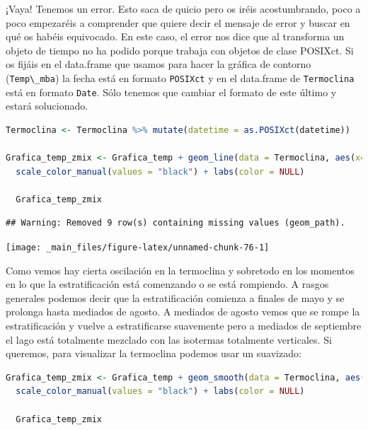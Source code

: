\documentclass[
]{book}
\newcommand{\passthrough}[1]{#1}
\begin{document}
¡Vaya! Tenemos un error. Esto saca de quicio pero os iréis acostumbrando, poco a poco empezaréis a comprender que quiere decir el mensaje de error y buscar en qué os habéis equivocado. En este caso, el error nos dice que al transforma un objeto de tiempo no ha podido porque trabaja con objetos de clase POSIXct. Si os fijáis en el data.frame que usamos para hacer la gráfica de contorno (\passthrough{\lstinline!Temp\_mba!}) la fecha está en formato \passthrough{\lstinline!POSIXct!} y en el data.frame de \passthrough{\lstinline!Termoclina!} está en formato \passthrough{\lstinline!Date!}. Sólo tenemos que cambiar el formato de este último y estará solucionado.

\begin{lstlisting}[language=R]
Termoclina <- Termoclina %>% mutate(datetime = as.POSIXct(datetime))

Grafica_temp_zmix <- Grafica_temp + geom_line(data = Termoclina, aes(x=datetime, y = thermo.depth, color = "Termoclina"), size = 0.2)+
  scale_color_manual(values = "black") + labs(color = NULL)
  
  Grafica_temp_zmix
\end{lstlisting}

\begin{lstlisting}
## Warning: Removed 9 row(s) containing missing values (geom_path).
\end{lstlisting}

\texttt{[image: \_main\_files/figure-latex/unnamed-chunk-76-1]}

Como vemos hay cierta oscilación en la termoclina y sobretodo en los momentos en lo que la estratificación está comenzando o se está rompiendo. A rasgos generales podemos decir que la estratificación comienza a finales de mayo y se prolonga hasta mediados de agosto. A mediados de agosto vemos que se rompe la estratificación y vuelve a estratificarse suavemente pero a mediados de septiembre el lago está totalmente mezclado con las isotermas totalmente verticales. Si queremos, para visualizar la termoclina podemos usar un suavizado:

\begin{lstlisting}[language=R]
Grafica_temp_zmix <- Grafica_temp + geom_smooth(data = Termoclina, aes(x=datetime, y = thermo.depth, color = "Termoclina"), size = 0.2, na.rm = TRUE, se = FALSE)+
  scale_color_manual(values = "black") + labs(color = NULL)
  
  Grafica_temp_zmix
\end{lstlisting}
\end{document}
